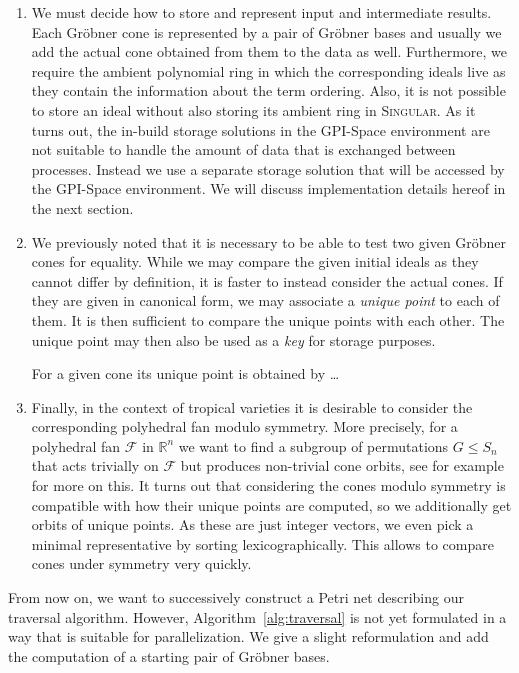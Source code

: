 \documentclass[
  paper=a4,
  titlepage,
  bibliography=totoc,
  listof=totoc,
  pagesize=pdftex
]{scrartcl}
\numberwithin{figure}{section}
\numberwithin{equation}{section}
\numberwithin{table}{section}
\newcommand*\setR{\mathds{R}}
\theoremstyle{definition}
\numberwithin{definition}{section}
\begin{document}
\begin{enumerate}[label=\arabic*.]
  \item We must decide how to store and represent input and intermediate results. Each
    Gröbner cone is represented by a pair of Gröbner bases and usually we add the actual
    cone obtained from them to the data as well. Furthermore, we require the ambient
    polynomial ring in which the corresponding ideals live as they contain the information
    about the term ordering. Also, it is not possible to store an ideal without also
    storing its ambient ring in \textsc{Singular}. As it turns out, the in-build storage
    solutions in the GPI-Space environment are not suitable to handle the amount of data
    that is exchanged between processes. Instead we use a separate storage solution that
    will be accessed by the GPI-Space environment. We will discuss implementation details
    hereof in the next section.
  \item We previously noted that it is necessary to be able to test two given Gröbner
    cones for equality. While we may compare the given initial ideals as they cannot
    differ by definition, it is faster to instead consider the actual cones. If they are
    given in canonical form, we may associate a \emph{unique point} to each of them. It is
    then sufficient to compare the unique points with each other. The unique point may
    then also be used as a \emph{key} for storage purposes.

    For a given  cone its unique point is obtained by \dots %
  \item Finally, in the context of tropical varieties it is desirable to consider the
    corresponding polyhedral fan modulo symmetry. More precisely, for a polyhedral fan
    $\mathcal F$ in $\setR^n$ we want to find a subgroup of permutations $G \leq S_n$ that
    acts trivially on $\mathcal F$ but produces non-trivial cone orbits, see for example
    \cite{JenTravSym} for more on this. It turns out that considering the cones modulo
    symmetry is compatible with how their unique points are computed, so we additionally
    get orbits of unique points. As these are just integer vectors, we even pick a minimal
    representative by sorting lexicographically. This allows to compare cones under
    symmetry very quickly.
\end{enumerate}
From now on, we want to successively construct a Petri net describing our traversal
algorithm. However, Algorithm~\ref{alg:traversal} is not yet formulated in a way that is
suitable for parallelization. We give a slight reformulation and add the computation of a
starting pair of Gröbner bases.
\end{document}
